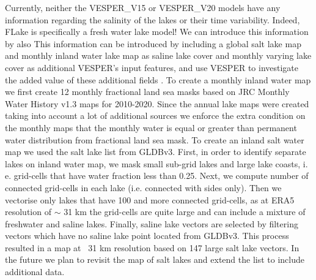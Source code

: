 \documentclass[hess, twostagejnl]{copernicus}
\providecommand{\DIFadd}[1]{{\protect\color{blue} \sf #1}} %
\providecommand{\DIFdel}[1]{{\protect\color{red} \scriptsize #1}} %
\providecommand{\DIFaddbegin}{} %
\providecommand{\DIFaddend}{} %
\providecommand{\DIFdelbegin}{} %
\providecommand{\DIFdelend}{} %
\begin{document}
\DIFdelbegin %
\DIFdelend Currently, neither \DIFdelbegin \DIFdel{the }\DIFdelend \DIFaddbegin \DIFadd{VESPER\_}\DIFaddend V15 or \DIFaddbegin \DIFadd{VESPER\_}\DIFaddend V20 \DIFdelbegin \DIFdel{models }\DIFdelend have any information regarding the salinity of the lakes or their time variability. Indeed, FLake is specifically a fresh water lake model! \DIFdelbegin \DIFdel{We can introduce this information by also }\DIFdelend \DIFaddbegin \DIFadd{This information can be introduced by }\DIFaddend including a global \DIFdelbegin \DIFdel{salt lake map and monthly inland water lake map as }\DIFdelend \DIFaddbegin \DIFadd{saline lake cover and monthly varying lake cover as additional VESPER’s }\DIFaddend input features, and \DIFdelbegin \DIFdel{use VESPER to investigate the added value of these additional fields .  To create a monthly inland water map we first create 12 monthly fractional land sea masks based on JRC Monthly Water History v1.3 maps for 2010-2020. Since the annual lake maps were created taking into account a lot of additional sources we enforce the extra condition on the monthly maps that the monthly water is equal or greater than permanent water distribution from fractional land sea mask. To create an inland salt water map we used the salt lake list from GLDBv3. First, in order to identify separate lakes on inland water map, we mask small sub-grid lakes and large lake coasts, i. e. grid-cells that have water fraction less than 0.25. Next, we compute number of connected grid-cells in each lake (i.e. connected with sides only). Then we vectorise only lakes that have 100 and more connected grid-cells, as at ERA5 resolution of $\sim$ 31 km the grid-cells are quite large and can include a mixture of freshwater and saline lakes. Finally, saline lake vectors are selected by filtering vectors which have no saline lake point located from GLDBv3. This process resulted in a map at ~31 km resolution based on 147 large salt lake vectors. In the future we plan to revisit the map of salt lakes and extend the list to include additional data. }%
\end{document}

